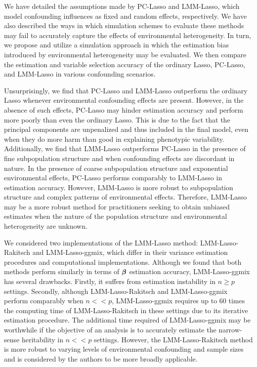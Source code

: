 We have detailed the assumptions made by PC-Lasso and LMM-Lasso, which model confounding influences as fixed and random effects, respectively. We have also described the ways in which simulation schemes to evaluate these methods may fail to accurately capture the effects of environmental heterogeneity. In turn, we propose and utilize a simulation approach in which the estimation bias introduced by environmental heterogeneity may be evaluated. We then compare the estimation and variable selection accuracy of the ordinary Lasso, PC-Lasso, and LMM-Lasso in various confounding scenarios.

Unsurprisingly, we find that PC-Lasso and LMM-Lasso outperform the ordinary Lasso whenever environmental confounding effects are present. However, in the absence of such effects, PC-Lasso may hinder estimation accuracy and perform more poorly than even the ordinary Lasso. This is due to the fact that the principal components are unpenalized and thus included in the final model, even when they do more harm than good in explaining phenotypic variability. Additionally, we find that LMM-Lasso outperforms PC-Lasso in the presence of fine subpopulation structure and when confounding effects are discordant in nature. In the presence of coarse subpopulation structure and exponential environmental effects, PC-Lasso performs comparably to LMM-Lasso in estimation accuracy. However, LMM-Lasso is more robust to subpopulation structure and complex patterns of environmental effects. Therefore, LMM-Lasso may be a more robust method for practitioners seeking to obtain unbiased estimates when the nature of the population structure and environmental heterogeneity are unknown.  

We considered two implementations of the LMM-Lasso method: LMM-Lasso-Rakitsch and LMM-Lasso-ggmix, which differ in their variance estimation procedures and computational implementations. Although we found that both methods perform similarly in terms of $\boldsymbol{\beta}{}$ estimation accuracy, LMM-Lasso-ggmix has several drawbacks. Firstly, it suffers from estimation instability in $n \ge p$ settings. Secondly, although LMM-Lasso-Rakitsch and LMM-Lasso-ggmix perform comparably when $n << p$, LMM-Lasso-ggmix requires up to 60 times the computing time of LMM-Lasso-Rakitsch in these settings due to its iterative estimation procedure. The additional time required of LMM-Lasso-ggmix may be worthwhile if the objective of an analysis is to accurately estimate the narrow-sense heritability in $n << p$ settings. However, the LMM-Lasso-Rakitsch method is more robust to varying levels of environmental confounding and sample sizes and is considered by the authors to be more broadly applicable. 

